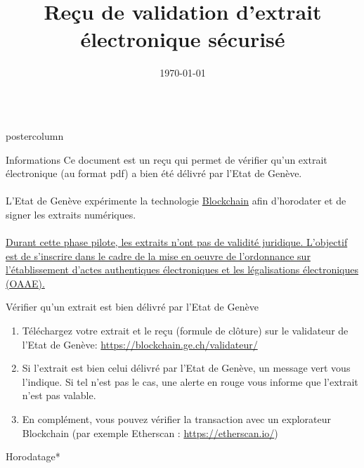 \documentclass[roundedcorners=true, titleposition=center]{beamerthemeruhuisstijlposter}
\institute[CLS]{République et canton de Genève}
\title{Reçu de validation d’extrait électronique sécurisé}
\date{\today}
\begin{document}
\begin{frame}
\begin{columns}
\begin{column}{0.95\textwidth}
\begin{beamercolorbox}[center, wd=\textwidth]{postercolumn}
\begin{minipage}[T]{0.95\textwidth}
\parbox[t][\columnheight]{\textwidth}{%
  \begin{block}{Informations}
  	Ce document est un reçu qui permet de vérifier qu'un extrait électronique (au format pdf) a bien été délivré par l’Etat de Genève.
   \\
   \\
	L'Etat de Genève expérimente la technologie \href{https://demain.ge.ch/blog/geneve-lab/blockchain-presentee-discutee-lors-cafe-republique-numerique-22-03-2017}{Blockchain} afin d'horodater et de signer les extraits numériques.
\\
\\
	\ul{Durant cette phase pilote, les extraits n’ont pas de validité juridique.
L’objectif est de s’inscrire dans le cadre de la mise en oeuvre de l’ordonnance sur l’établissement d’actes authentiques électroniques et les légalisations électroniques (OAAE).}
  \end{block}
\medskip
\begin{block}{Vérifier qu'un extrait est bien délivré par l’Etat de Genève} 
\end{block}
\begin{enumerate}
\item Téléchargez votre extrait et le reçu (formule de clôture) sur le validateur de l’Etat de Genève: \url{https://blockchain.ge.ch/validateur/}
\item Si l’extrait est bien celui délivré par l’Etat de Genève, un message vert vous l’indique. Si tel n’est pas le cas, une alerte en rouge vous informe que l’extrait n’est pas valable.
\item  En complément, vous pouvez vérifier la transaction avec un explorateur Blockchain (par exemple  Etherscan : \url{https://etherscan.io/})
\end{enumerate}
  \medskip
    
  \begin{block}{Horodatage*}
 

\end{block}}
\end{minipage}
\end{beamercolorbox}
\end{column}
\end{columns}
\end{frame}
\end{document}
